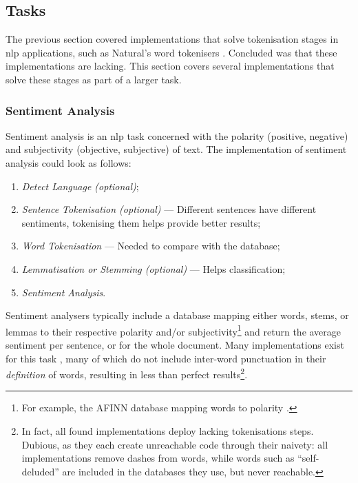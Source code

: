 \subsection{Tasks}\label{tasks}

The previous section covered implementations that solve tokenisation stages
  in \gls{nlp} applications, such as Natural's word
  tokenisers \autocite{NaturalNode/natural-source-code}.
Concluded was that these implementations are lacking.
This section covers several implementations that solve these stages
  as part of a larger task.

\subsubsection{Sentiment Analysis}\label{sentiment-analysis}

Sentiment analysis is an \gls{nlp} task concerned with the polarity
  (positive, negative) and subjectivity (objective, subjective) of text.
The implementation of sentiment analysis could look as follows:

\begin{enumerate}
\item\emph{Detect Language (optional)};
\item\emph{Sentence Tokenisation (optional)} --- Different sentences have
    different sentiments, tokenising them helps provide better results;
\item\emph{Word Tokenisation} --- Needed to compare with the database;
\item\emph{Lemmatisation or Stemming (optional)} --- Helps classification;
\item\emph{Sentiment Analysis}.
\end{enumerate}

Sentiment analysers typically include a
  database mapping either words, stems, or lemmas to their respective
  polarity and\slash or subjectivity\footnote{For example, the AFINN
    database mapping words to polarity \autocite{nielsen-finn-arup-afinn}.}
  and return the average sentiment per sentence, or for the whole document.
Many implementations exist for this task
  \autocites{thinkroth/sentimental-source-code}{mileszim/sediment-source-code}
  {thisandagain/sentiment-source-code}, many of which do not include
  inter-word punctuation in their \emph{definition} of words, resulting in
  less than perfect results\footnote{In fact, all found implementations
      deploy lacking tokenisations steps.
    Dubious, as they each create unreachable code through their naivety:
      all implementations remove dashes from words, while words such as
      ``self-deluded'' are included in the databases they use, but never
      reachable.}.

